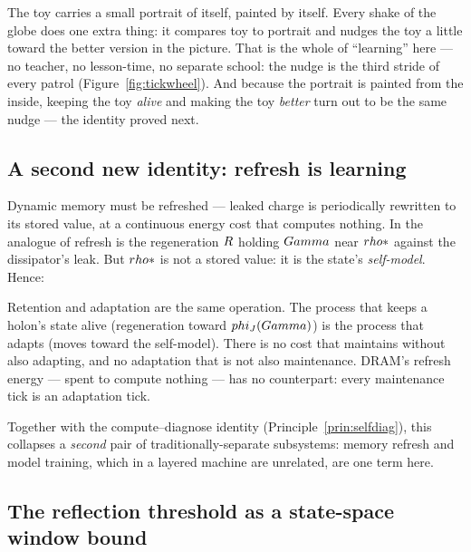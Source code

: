 \begin{zerobox}
The toy carries a small portrait of itself, painted by itself. Every shake of
the globe does one extra thing: it compares toy to portrait and nudges the
toy a little toward the better version in the picture. That is the whole of
``learning'' here --- no teacher, no lesson-time, no separate school: the
nudge is the third stride of every patrol (Figure~\ref{fig:tickwheel}). And
because the portrait is painted from the inside, keeping the toy \emph{alive}
and making the toy \emph{better} turn out to be the same nudge --- the
identity proved next.
\end{zerobox}

\subsection{A second new identity: refresh is learning}

Dynamic memory must be refreshed --- leaked charge is periodically rewritten
to its stored value, at a continuous energy cost that computes nothing. In
\TALOS{} the analogue of refresh is the regeneration $R$ holding $Gamma$
near $rho*$ against the dissipator's leak. But $rho*$ is not a stored
value: it is the state's \emph{self-model}. Hence:

\begin{principle}\label{prin:refresh}
Retention and adaptation are the same operation. The process that keeps a
holon's state alive (regeneration toward $phi_J(Gamma)$) is the process that
adapts (moves toward the self-model). There is no cost that maintains without
also adapting, and no adaptation that is not also maintenance. DRAM's
refresh energy --- spent to compute nothing --- has no counterpart: every
maintenance tick is an adaptation tick.
\end{principle}

\noindent Together with the compute--diagnose identity
(Principle~\ref{prin:selfdiag}), this collapses a \emph{second} pair of
traditionally-separate subsystems: memory refresh and model training, which
in a layered machine are unrelated, are one term here.

\subsection{The reflection threshold as a state-space window bound}

